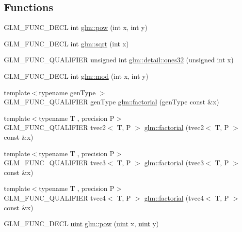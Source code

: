 \subsection*{Functions}
\begin{DoxyCompactItemize}
\item 
G\+L\+M\+\_\+\+F\+U\+N\+C\+\_\+\+D\+E\+C\+L int \hyperlink{group__gtx__integer_ga9642514a44a67afa70966d756f040ca9}{glm\+::pow} (int x, int y)
\item 
G\+L\+M\+\_\+\+F\+U\+N\+C\+\_\+\+D\+E\+C\+L int \hyperlink{group__gtx__integer_ga78e2e68330e91d350fcfc2f4831cad12}{glm\+::sqrt} (int x)
\item 
G\+L\+M\+\_\+\+F\+U\+N\+C\+\_\+\+Q\+U\+A\+L\+I\+F\+I\+E\+R unsigned int \hyperlink{namespaceglm_1_1detail_a2699e3b3ea6ad8d4bb99aed56761582c}{glm\+::detail\+::ones32} (unsigned int x)
\item 
G\+L\+M\+\_\+\+F\+U\+N\+C\+\_\+\+D\+E\+C\+L int \hyperlink{group__gtx__integer_gab9d22df91aac4d9eb925a4910f556f1b}{glm\+::mod} (int x, int y)
\item 
{\footnotesize template$<$typename gen\+Type $>$ }\\G\+L\+M\+\_\+\+F\+U\+N\+C\+\_\+\+Q\+U\+A\+L\+I\+F\+I\+E\+R gen\+Type \hyperlink{group__gtx__integer_ga8cbd3120905f398ec321b5d1836e08fb}{glm\+::factorial} (gen\+Type const \&x)
\item 
{\footnotesize template$<$typename T , precision P$>$ }\\G\+L\+M\+\_\+\+F\+U\+N\+C\+\_\+\+Q\+U\+A\+L\+I\+F\+I\+E\+R tvec2$<$ T, P $>$ \hyperlink{namespaceglm_a2413666012b76baf1d3f0c44002f1154}{glm\+::factorial} (tvec2$<$ T, P $>$ const \&x)
\item 
{\footnotesize template$<$typename T , precision P$>$ }\\G\+L\+M\+\_\+\+F\+U\+N\+C\+\_\+\+Q\+U\+A\+L\+I\+F\+I\+E\+R tvec3$<$ T, P $>$ \hyperlink{namespaceglm_ab41ee15497a5efb175292e635daa4918}{glm\+::factorial} (tvec3$<$ T, P $>$ const \&x)
\item 
{\footnotesize template$<$typename T , precision P$>$ }\\G\+L\+M\+\_\+\+F\+U\+N\+C\+\_\+\+Q\+U\+A\+L\+I\+F\+I\+E\+R tvec4$<$ T, P $>$ \hyperlink{namespaceglm_a521766929c175b805ff9856d23c4e36c}{glm\+::factorial} (tvec4$<$ T, P $>$ const \&x)
\item 
G\+L\+M\+\_\+\+F\+U\+N\+C\+\_\+\+D\+E\+C\+L \hyperlink{stb__image_8c_a91ad9478d81a7aaf2593e8d9c3d06a14}{uint} \hyperlink{group__gtx__integer_gaa8229e850c3cc4ad83492fe390ada044}{glm\+::pow} (\hyperlink{stb__image_8c_a91ad9478d81a7aaf2593e8d9c3d06a14}{uint} x, \hyperlink{stb__image_8c_a91ad9478d81a7aaf2593e8d9c3d06a14}{uint} y)

\end{DoxyCompactItemize}
